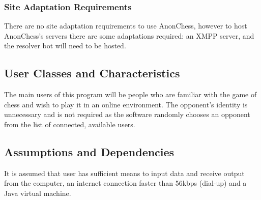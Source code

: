 \subsubsection{Site Adaptation Requirements}
There are no site adaptation requirements to use AnonChess, however to host AnonChess's servers there are some adaptations required: an XMPP server, and the resolver bot will need to be hosted.

\subsection{User Classes and Characteristics}
The main users of this program will be people who are familiar with the game of chess and wish to play it in an online environment. The opponent's identity is unnecessary and is not required as the software randomly chooses an opponent from the list of connected, available users.

\subsection{Assumptions and Dependencies}
It is assumed that user has sufficient means to input data and receive output from the computer, an internet connection faster than 56kbps (dial-up) and a Java virtual machine.
